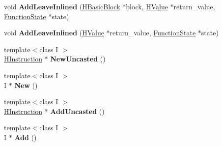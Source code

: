 \begin{DoxyCompactItemize}
\item 
void {\bfseries Add\+Leave\+Inlined} (\hyperlink{classv8_1_1internal_1_1_h_basic_block}{H\+Basic\+Block} $\ast$block, \hyperlink{classv8_1_1internal_1_1_h_value}{H\+Value} $\ast$return\+\_\+value, \hyperlink{classv8_1_1internal_1_1_function_state}{Function\+State} $\ast$state)\hypertarget{classv8_1_1internal_1_1_h_graph_builder_af52a2feef21c80ffd1f0d767e7ab64b3}{}\label{classv8_1_1internal_1_1_h_graph_builder_af52a2feef21c80ffd1f0d767e7ab64b3}

\item 
void {\bfseries Add\+Leave\+Inlined} (\hyperlink{classv8_1_1internal_1_1_h_value}{H\+Value} $\ast$return\+\_\+value, \hyperlink{classv8_1_1internal_1_1_function_state}{Function\+State} $\ast$state)\hypertarget{classv8_1_1internal_1_1_h_graph_builder_a50e208c659ee3412eca8d0bfb9496b9e}{}\label{classv8_1_1internal_1_1_h_graph_builder_a50e208c659ee3412eca8d0bfb9496b9e}

\item 
{\footnotesize template$<$class I $>$ }\\\hyperlink{classv8_1_1internal_1_1_h_instruction}{H\+Instruction} $\ast$ {\bfseries New\+Uncasted} ()\hypertarget{classv8_1_1internal_1_1_h_graph_builder_aad1aec7021a863f7ee3063eace5e6bb1}{}\label{classv8_1_1internal_1_1_h_graph_builder_aad1aec7021a863f7ee3063eace5e6bb1}

\item 
{\footnotesize template$<$class I $>$ }\\I $\ast$ {\bfseries New} ()\hypertarget{classv8_1_1internal_1_1_h_graph_builder_a0d8a69b10a17d9a58d8a57522787470a}{}\label{classv8_1_1internal_1_1_h_graph_builder_a0d8a69b10a17d9a58d8a57522787470a}

\item 
{\footnotesize template$<$class I $>$ }\\\hyperlink{classv8_1_1internal_1_1_h_instruction}{H\+Instruction} $\ast$ {\bfseries Add\+Uncasted} ()\hypertarget{classv8_1_1internal_1_1_h_graph_builder_aa3c94f36b42da5aadc5a4b670e059ecc}{}\label{classv8_1_1internal_1_1_h_graph_builder_aa3c94f36b42da5aadc5a4b670e059ecc}

\item 
{\footnotesize template$<$class I $>$ }\\I $\ast$ {\bfseries Add} ()\hypertarget{classv8_1_1internal_1_1_h_graph_builder_ac9903cf29b61067b844affba8e65f1ae}{}\label{classv8_1_1internal_1_1_h_graph_builder_ac9903cf29b61067b844affba8e65f1ae}


\end{DoxyCompactItemize}
